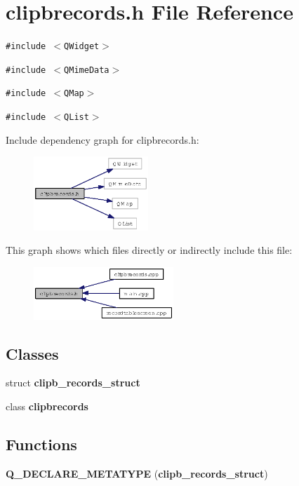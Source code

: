 \section{clipbrecords.h File Reference}
\label{clipbrecords_8h}
{\tt \#include $<$QWidget$>$}\par
{\tt \#include $<$QMime\-Data$>$}\par
{\tt \#include $<$QMap$>$}\par
{\tt \#include $<$QList$>$}\par


Include dependency graph for clipbrecords.h:\begin{figure}[H]
\begin{center}
\leavevmode
\includegraphics[width=122pt]{clipbrecords_8h__incl}
\end{center}
\end{figure}


This graph shows which files directly or indirectly include this file:\begin{figure}[H]
\begin{center}
\leavevmode
\includegraphics[width=149pt]{clipbrecords_8h__dep__incl}
\end{center}
\end{figure}
\subsection*{Classes}
\begin{CompactItemize}
\item 
struct {\bf clipb\_\-records\_\-struct}
\item 
class {\bf clipbrecords}
\end{CompactItemize}
\subsection*{Functions}
\begin{CompactItemize}
\item 
{\bf Q\_\-DECLARE\_\-METATYPE} ({\bf clipb\_\-records\_\-struct})
\end{CompactItemize}



